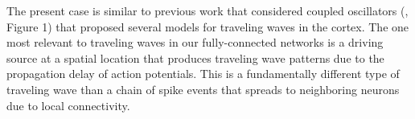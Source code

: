 The present case is similar to previous work that considered coupled oscillators  (\citet{ermentrout2001}, Figure 1) that proposed several models for traveling waves in the cortex.
The one most relevant to traveling waves in our fully-connected networks is a driving source at a spatial location that produces traveling wave patterns due to the propagation delay of action potentials.
This is a fundamentally different type of traveling wave than a chain of spike events that spreads to neighboring neurons due to local connectivity.

\endinput

